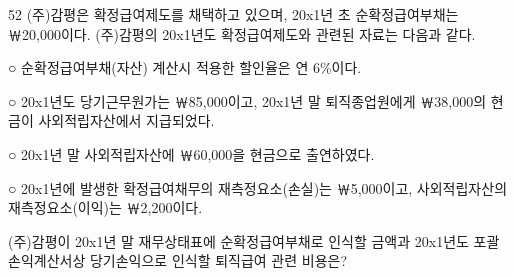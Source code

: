 \begin{question}{52}
(주)감평은 확정급여제도를 채택하고 있으며, 20x1년 초 순확정급여부채는 ￦20,000이다. (주)감평의 20x1년도 확정급여제도와 관련된 자료는 다음과 같다.
\begin{framedtext}
○ 순확정급여부채(자산) 계산시 적용한 할인율은 연 6\%이다. \par
○ 20x1년도 당기근무원가는 ￦85,000이고, 20x1년 말 퇴직종업원에게 ￦38,000의 현금이 사외적립자산에서 지급되었다. \par
○ 20x1년 말 사외적립자산에 ￦60,000을 현금으로 출연하였다. \par
○ 20x1년에 발생한 확정급여채무의 재측정요소(손실)는 ￦5,000이고, 사외적립자산의 재측정요소(이익)는 ￦2,200이다. \par
\end{framedtext}
(주)감평이 20x1년 말 재무상태표에 순확정급여부채로 인식할 금액과 20x1년도 포괄손익계산서상 당기손익으로 인식할 퇴직급여 관련 비용은?
{\par\noindent\hspace*{2em}\par}
\begin{choices}
  \item {}
  \item {}
  \item {}
  \item {}
  \item {}
\end{choices}
\end{question}

